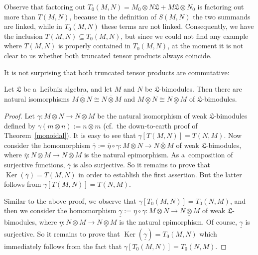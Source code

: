 \documentclass{jonasart}
\DeclareMathOperator{\Ker}{Ker}
\newcommand{\lf}{\mathfrak{L}}
\newcommand{\ovo}{\overline{\otimes}}
\newcommand{\und}{\underline{\otimes}}
\begin{document}
	\begin{remark}
		{Observe that factoring out $T_0 (M,N)=M_0\otimes
		N\lf+M\lf\otimes N_0$ is factoring out more than $T(M,N)$, because in the definition of $S(M,N)$ the two summands are linked, while in $T_0 (M,N)$ these terms are not linked. Consequently, we have the inclusion $T(M,N)\subseteq
		T_0 (M,N)$, but since we could not find any example where
		$T(M,N)$ is properly contained in $T_0 (M,N)$, at the moment it is not clear to us whether both truncated tensor products always coincide.}
	\end{remark}
	It is not surprising that both truncated tensor products are commutative:
	\begin{proposition}\label{comm}
		Let $\lf$ be a~Leibniz algebra, and let $M$ and $N$ be
		$\lf$-bimodules. Then there are natural isomorphisms $M
		\ovo N\cong N\ovo M$ and $M\und N\cong N\und M$ of
		$\lf$-bimodules.
	\end{proposition}

	\begin{proof}
		Let $\gamma:M\otimes N\to N\otimes M$ be the natural isomorphism of weak $\lf$-bimodules defined by $\gamma(m\otimes n):=n\otimes m$ (cf.\ the down-to-earth proof of Theorem~\ref{monoidal}). It is easy to see that $\gamma[T(M,N)]=T(N,M)$. Now consider the homomorphism $\overline{\gamma}:=\overline{\eta}\circ
		\gamma:M\otimes N\to N\ovo M$ of weak $\lf$-bimodules, where
		$\overline{\eta}:N\otimes M\to N\ovo M$ is the natural epimorphism. As a~composition of surjective functions, $\overline{\gamma}$
		is also surjective. So it remains to prove that $\Ker(\overline{\gamma})
		=T(M,N)$ in order to establish the first assertion. But the latter follows from $\gamma[T(M,N)] =T(N,M)$.

		Similar to the above proof, we observe that $\gamma[T_0 (M,N)]
		=T_0 (N,M)$, and then we consider the homomorphism
		$\underline{\gamma}:=\underline{\eta}\circ\gamma:M\otimes N
		\to N\und M$ of weak $\lf$-bimodules, where $\underline{\eta}:
		N\otimes M\to N\und M$ is the natural epimorphism. Of course,
		$\underline{\gamma}$ is surjective. So it remains to prove that
		$\Ker(\underline{\gamma})=T_0 (M,N)$ which immediately follows from the fact that $\gamma[T_0 (M,N)]=T_0 (N,M)$.
	\end{proof}
\end{document}
